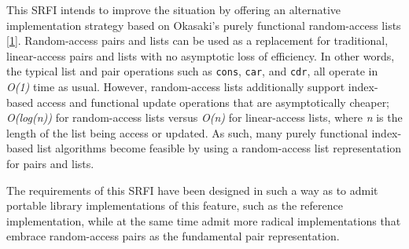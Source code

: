 This SRFI intends to improve the situation by offering an alternative
implementation strategy based on Okasaki's purely functional
random-access lists {[}\protect\hyperlink{note-1}{1}{]}. Random-access
pairs and lists can be used as a replacement for traditional,
linear-access pairs and lists with no asymptotic loss of efficiency. In
other words, the typical list and pair operations such as \texttt{cons},
\texttt{car}, and \texttt{cdr}, all operate in \emph{O(1)} time as
usual. However, random-access lists additionally support index-based
access and functional update operations that are asymptotically cheaper;
\emph{O(log(n))} for random-access lists versus \emph{O(n)} for
linear-access lists, where \emph{n} is the length of the list being
access or updated. As such, many purely functional index-based list
algorithms become feasible by using a random-access list representation
for pairs and lists.

The requirements of this SRFI have been designed in such a way as to
admit portable library implementations of this feature, such as the
reference implementation, while at the same time admit more radical
implementations that embrace random-access pairs as the fundamental pair
representation.


